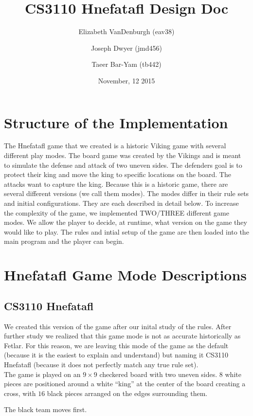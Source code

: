 \documentclass[11pt, oneside]{article}
\title{CS3110 Hnefatafl Design Doc}
\author{Elizabeth VanDenburgh (eav38)\and Joseph Dwyer (jmd456)\and Taeer Bar-Yam (tb442)}
\date{November, 12 2015}
\begin{document}
\maketitle

\section{Structure of the Implementation}
The Hnefatafl game that we created is a historic Viking game with several different play modes.
The board game was created by the Vikings and is meant to simulate the defense and attack
of two uneven sides.  The defenders goal is to protect their king and move the king to specific
locations on the board.  The attacks want to capture the king.  Because this is a historic
game, there are several different versions (we call them modes).
The modes differ in their rule sets and initial configurations.
They are each described in detail below. To increase the complexity of the game, we implemented
TWO/THREE different game modes.  We allow the player
to decide, at runtime, what version on the game they would like to play.  The rules
and intial setup of the game are then loaded into the main program and the player
can begin.

\section{Hnefatafl Game Mode Descriptions}
\subsection{CS3110 Hnefatafl}
We created this version of the game after our inital study of the rules.  After further study
we realized that this game mode is not as accurate historically as Fetlar.  For this reason, we
are leaving this mode of the game as the default (because it is the easiest to explain and understand)
but naming it CS3110 Hnefatafl (because it does not perfectly match any true rule set).\\
The game is played on an $9\times 9$ checkered board with two uneven sides.
$8$ white pieces are positioned around a white ``king'' at the center of the
board creating a cross, with $16$ black pieces arranged on the edges surrounding them.

The black team moves first.
\end{document}
